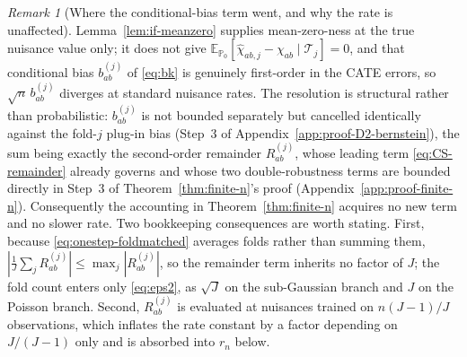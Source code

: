 \documentclass[11pt]{article}
\theoremstyle{plain}
\theoremstyle{definition}
\theoremstyle{remark}
\newtheorem{remark}[theorem]{Remark}
\newcommand{\E}{\mathbb{E}}
\newcommand{\PP}{\mathbb{P}}
\begin{document}
\begin{remark}[Where the conditional-bias term went, and why the rate is
unaffected]\label{rem:bk-routing}
Lemma~\ref{lem:if-meanzero} supplies mean-zero-ness at the true nuisance value only; it
does not give $\E_{\PP_0}[\hat\chi_{ab,j}-\chi_{ab}\mid\mathcal T_j]=0$, and that
conditional bias $b^{(j)}_{ab}$ of \eqref{eq:bk} is genuinely first-order in the CATE
errors, so $\sqrt n\,b^{(j)}_{ab}$ diverges at standard nuisance rates. The resolution is
structural rather than probabilistic: $b^{(j)}_{ab}$ is not bounded separately but
cancelled identically against the fold-$j$ plug-in bias (Step~3 of
Appendix~\ref{app:proof-D2-bernstein}), the sum being exactly
the second-order remainder $R^{(j)}_{ab}$, whose leading term \eqref{eq:CS-remainder}
already governs and whose two double-robustness terms are bounded directly in Step~3 of
Theorem~\ref{thm:finite-n}'s proof (Appendix~\ref{app:proof-finite-n}).
Consequently the accounting in Theorem~\ref{thm:finite-n} acquires no new term and no
slower rate. Two bookkeeping consequences are worth stating. First, because
\eqref{eq:onestep-foldmatched} averages folds rather than summing them,
$|\frac1J\sum_jR^{(j)}_{ab}|\le\max_j|R^{(j)}_{ab}|$, so the remainder term inherits no
factor of $J$; the fold count enters only \eqref{eq:eps2}, as $\sqrt J$ on the
sub-Gaussian branch and $J$ on the Poisson branch. Second, $R^{(j)}_{ab}$ is evaluated at
nuisances trained on $n(J-1)/J$ observations, which inflates the rate constant by a
factor depending on $J/(J-1)$ only and is absorbed into $r_n$ below.
\end{remark}
\end{document}
